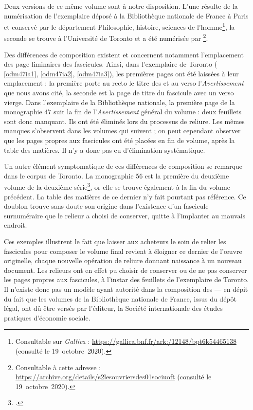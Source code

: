 Deux versions de ce même volume sont à notre disposition. L'une résulte de la numérisation de l'exemplaire déposé à la Bibliothèque nationale de France à Paris et conservé par le département Philosophie, histoire, sciences de l'homme\footnote{Consultable sur \textit{Gallica} : \url{https://gallica.bnf.fr/ark:/12148/bpt6k54465138} (consulté le 19~octobre~2020).}, la seconde se trouve à l'Université de Toronto et a été numérisée par \ia\footnote{Consultable à cette adresse : \url{https://archive.org/details/s2lesouvriersdes01sociuoft} (consulté le 19~octobre~2020).}.

Des différences de composition existent et concernent notamment l'emplacement des page liminaires des fascicules. Ainsi, dans l'exemplaire de Toronto (\fig{} \ref{odm47ia1}, \ref{odm47ia2}, \ref{odm47ia3}), les premières pages ont été laissées à leur emplacement : la première porte au recto le titre des \odm{} et au verso l'\textit{Avertissement} que nous avons cité, la seconde est la page de titre du fascicule avec un verso vierge. Dans l'exemplaire de la Bibliothèque nationale, la première page de la monographie \no{}47 suit la fin de l'\textit{Avertissement} général du volume : deux feuillets sont donc manquant. Ils ont été éliminés lors du processus de reliure. Les mêmes manques s'observent dans les volumes qui suivent ; on peut cependant observer que les pages propres aux fascicules ont été placées en fin de volume, après la table des matières. Il n'y a donc pas eu d'élimination systématique.

Un autre élément symptomatique de ces différences de composition se remarque dans le corpus de Toronto. La monographie \no{}56 est la première du deuxième volume de la deuxième série\footcite{mono056a}, or elle se trouve également à la fin du volume précédent. La table des matières de ce dernier n'y fait pourtant pas référence. Ce doublon trouve sans doute son origine dans l'existence d'un fascicule surnuméraire que le relieur a choisi de conserver, quitte à l'implanter au mauvais endroit.

Ces exemples illustrent le fait que laisser aux acheteurs le soin de relier les fascicules pour composer le volume final revient à éloigner ce dernier de l'\oe{}uvre originelle, chaque nouvelle opération de reliure donnant naissance à un nouveau document. Les relieurs ont en effet pu choisir de conserver ou de ne pas conserver les pages propres aux fascicules, à l'instar des feuillets de l'exemplaire de Toronto. Il n'existe donc pas un modèle ayant autorité dans la composition des \odm{} --- en dépit du fait que les volumes de la Bibliothèque nationale de France, issus du dépôt légal, ont dû être versés par l'éditeur, \cad{} la Société internationale des études pratiques d'économie sociale.

